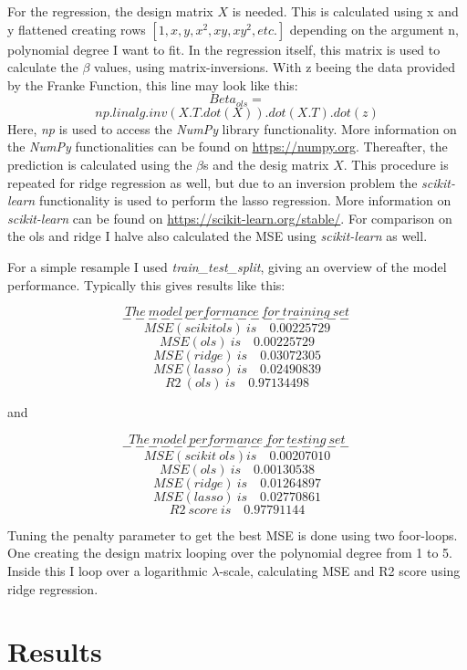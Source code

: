 \documentclass[a4paper,11pt,twocolumn]{article}
\begin{document}
For the regression, the design matrix $X$ is needed. This is calculated using x and y flattened creating rows $[1, x, y, x^2, xy, xy^2, etc.]$ depending on the argument n, polynomial degree I want to fit. In the regression itself, this matrix is used to calculate the $\beta$ values, using matrix-inversions. 
With z beeing the data provided by the Franke Function, this line may look like this:
$$Beta_{ols}=$$
$$np.linalg.inv(X.T.dot(X)).dot(X.T).dot(z)$$
Here, \textit{np} is used to access the \textit{NumPy} library functionality. More information on the \textit{NumPy} functionalities can be found on \url{https://numpy.org}. Thereafter, the prediction is calculated using the $\beta$s and the desig matrix $X$. This procedure is repeated for ridge regression as well, but due to an inversion problem the \textit{scikit-learn} functionality is used to perform the lasso regression. More information on \textit{scikit-learn} can be found on \url{https://scikit-learn.org/stable/}. For comparison on the ols and ridge I halve also calculated the MSE using \textit{scikit-learn} as well.

For a simple resample I used \textit{train\_test\_split}, giving an overview of the model performance. Typically this gives results like this:

$$The\:model\:performance\:for\:training\:set$$
$$------------------$$
$$MSE(scikit ols)\: is\quad 0.00225729$$
$$MSE(ols)\: is\quad 0.00225729$$
$$MSE(ridge)\: is\quad 0.03072305$$
$$MSE(lasso)\: is\quad  0.02490839$$
$$R2\:(ols)\: is\quad0.97134498$$

and

$$The\:model\:performance\:for\:testing\:set$$
$$------------------$$
$$MSE(scikit\:ols) is\quad 0.00207010$$
$$MSE (ols)\: is\quad 0.00130538$$
$$MSE (ridge)\:is\quad0.01264897$$
$$MSE (lasso)\:is\quad0.02770861$$
$$R2\: score\: is \quad0.97791144$$

Tuning the penalty parameter to get the best MSE is done using two foor-loops. One creating the design matrix looping over the polynomial degree from 1 to 5. Inside this I loop over a logarithmic $\lambda$-scale, calculating MSE and R2 score using ridge regression.


\section{Results}
\end{document}
